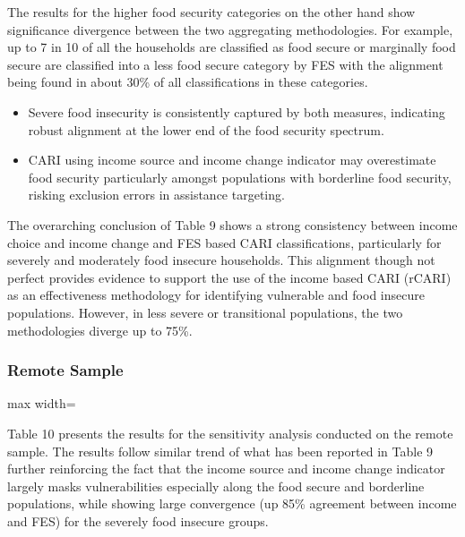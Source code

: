 \documentclass[11pt,harvard]{article}
\begin{document}
	The results for the higher food security categories on the other hand show significance divergence between the two aggregating methodologies. For example, up to 7 in 10 of all the households are classified as food secure or marginally food secure are classified into a less food secure category by FES with the alignment being found in about 30\% of all classifications in these categories. 
	
	\begin{itemize}
		\item Severe food insecurity is consistently captured by both measures, indicating robust alignment at the lower end of the food security spectrum.
		
		\item CARI using income source and income change indicator may overestimate food security particularly amongst populations with borderline food security, risking exclusion errors in assistance targeting.

	\end{itemize}

	The overarching conclusion of Table 9 shows a strong consistency between income choice and income change and FES based CARI classifications, particularly for severely and moderately food insecure households. This alignment though not perfect provides evidence to support the use of the income based CARI (rCARI) as an effectiveness methodology for identifying vulnerable and food insecure populations. However, in less severe or transitional populations, the two methodologies diverge up to 75\%.
	
	\subsubsection*{Remote Sample}
	\begin{table}[htbp]
		\centering
		\begin{adjustbox}{max width=\textwidth}
			\begin{threeparttable}
				\caption{Cross Tabulation of CARI\_Income and CARI\_FES - Remote Sample}
				\scriptsize
				 
				\label{tab:BF_RM_Cat_Cross_Tabulation}
			\end{threeparttable}
		\end{adjustbox}
	\end{table}
	
	Table 10 presents the results for the sensitivity analysis conducted on the remote sample. The results follow similar trend of what has been reported in Table 9 further reinforcing the fact that the income source and income change indicator largely masks vulnerabilities especially along the food secure and borderline populations, while showing large convergence (up 85\% agreement between income and FES) for the severely food insecure groups.
	
\end{document}
